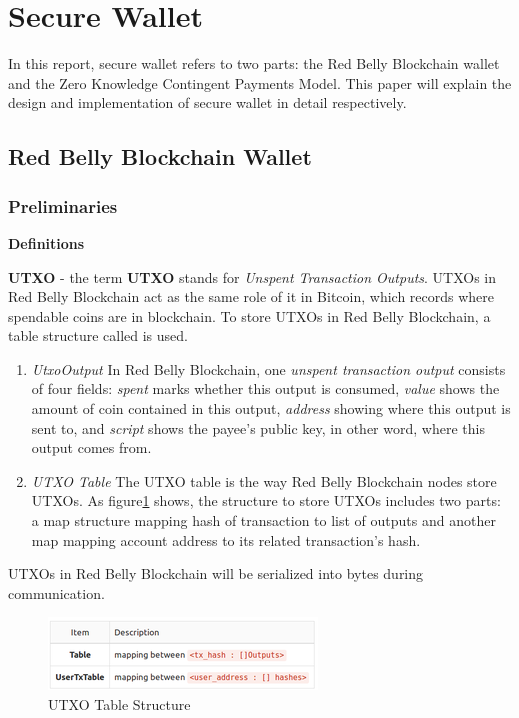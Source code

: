 \documentclass[12pt]{article}
\begin{document}
\section{Secure Wallet}

In this report, secure wallet refers to two parts: the Red Belly Blockchain wallet and the Zero Knowledge Contingent Payments Model. This paper will explain the design and implementation of secure wallet in detail respectively.

\subsection{Red Belly Blockchain Wallet}

\subsubsection{Preliminaries}
\label{sec:preliminaries}

\textbf{Definitions\\}

\textbf{UTXO} - the term \textbf{UTXO} stands for \textit{Unspent Transaction Outputs}. UTXOs in Red Belly Blockchain act as the same role of it in Bitcoin, which records where spendable coins are in blockchain. To store UTXOs in Red Belly Blockchain, a table structure called  is used.

\begin{enumerate}
    \item \textit{UtxoOutput} In Red Belly Blockchain, one \textit{unspent transaction output} consists of four fields: \textit{spent} marks whether this output is consumed, \textit{value} shows the amount of coin contained in this output, \textit{address} showing where this output is sent to, and \textit{script} shows the payee's public key, in other word, where this output comes from.

    \item \textit{UTXO Table} The UTXO table is the way Red Belly Blockchain nodes store UTXOs. As figure\ref{fig:utxo_table} shows, the structure to store UTXOs includes two parts: a map structure mapping hash of transaction to list of outputs and another map mapping account address to its related transaction's hash.
\end{enumerate}

UTXOs in Red Belly Blockchain will be serialized into bytes during communication.
\\

\begin{figure}
    \centering
    \includegraphics{utxo_table.png}
    \caption{UTXO Table Structure}
    \label{fig:utxo_table}
\end{figure}
\end{document}
